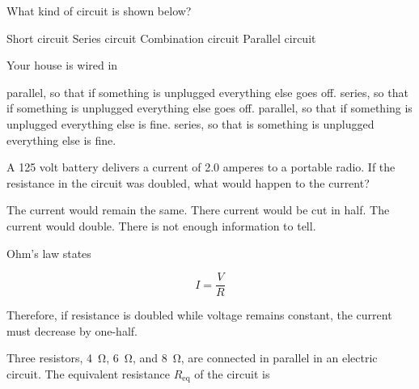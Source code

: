 \documentclass[answers]{exam}
\begin{document}
\begin{questions}
\question
What kind of circuit is shown below?

\begin{center}
\end{center}

\begin{randomizeoneparchoices}
    \choice Short circuit
    \choice Series circuit
    \correctchoice Combination circuit
    \choice Parallel circuit
\end{randomizeoneparchoices}

\question
Your house is wired in

\begin{randomizechoices}
    \choice parallel, so that if something is unplugged everything else goes off.
    \choice series, so that if something is unplugged everything else goes off.
    \correctchoice parallel, so that if something is unplugged everything else is fine.
    \choice series, so that is something is unplugged everything else is fine.
\end{randomizechoices}

\question
A 125 volt battery delivers a current of 2.0 amperes to a portable radio. If the resistance in the circuit was doubled, what would happen to the current?

\begin{randomizechoices}[keeplast]
    \choice The current would remain the same.
    \correctchoice There current would be cut in half.
    \choice The current would double.
    \choice There is not enough information to tell.
\end{randomizechoices}

\begin{solution}
Ohm's law states

\begin{equation*}
    I = \frac{V}{R}
\end{equation*}

Therefore, if resistance is doubled while voltage remains constant, the current must decrease by one-half.
\end{solution}

\question
Three resistors, \SI{4}{\ohm}, \SI{6}{\ohm}, and \SI{8}{\ohm}, are connected in parallel in an electric circuit. The equivalent resistance $R_\mathrm{eq}$ of the circuit is
\bigskip


\end{questions}
\end{document}
